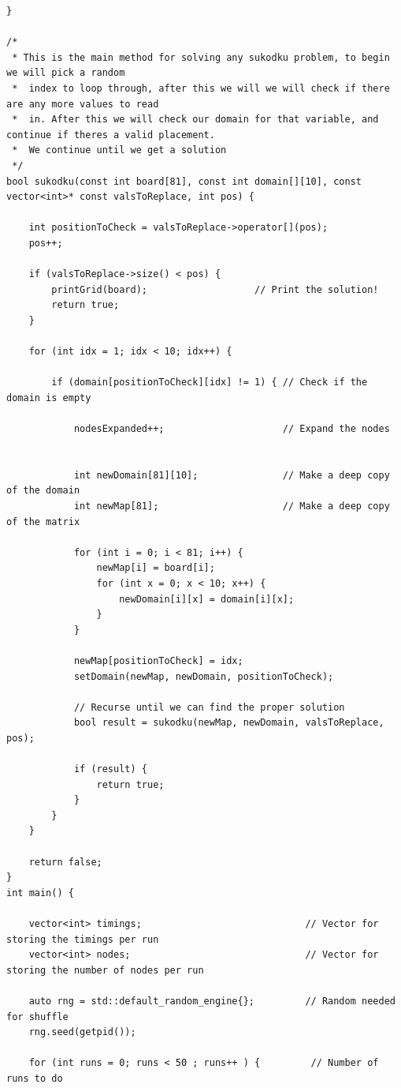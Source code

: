 \documentclass{article}
\begin{document}
\begin{titlepage}
\begin{lstlisting}
}

/*
 * This is the main method for solving any sukodku problem, to begin we will pick a random
 *  index to loop through, after this we will we will check if there are any more values to read
 *  in. After this we will check our domain for that variable, and continue if theres a valid placement.
 *  We continue until we get a solution
 */
bool sukodku(const int board[81], const int domain[][10], const vector<int>* const valsToReplace, int pos) {

    int positionToCheck = valsToReplace->operator[](pos);
    pos++;

    if (valsToReplace->size() < pos) {
        printGrid(board);                   // Print the solution!
        return true;
    }

    for (int idx = 1; idx < 10; idx++) {

        if (domain[positionToCheck][idx] != 1) { // Check if the domain is empty

            nodesExpanded++;                     // Expand the nodes


            int newDomain[81][10];               // Make a deep copy of the domain
            int newMap[81];                      // Make a deep copy of the matrix

            for (int i = 0; i < 81; i++) {
                newMap[i] = board[i];
                for (int x = 0; x < 10; x++) {
                    newDomain[i][x] = domain[i][x];
                }
            }

            newMap[positionToCheck] = idx;
            setDomain(newMap, newDomain, positionToCheck);

            // Recurse until we can find the proper solution
            bool result = sukodku(newMap, newDomain, valsToReplace, pos);

            if (result) {
                return true;
            }
        }
    }

    return false;
}
int main() {

    vector<int> timings;                             // Vector for storing the timings per run
    vector<int> nodes;                               // Vector for storing the number of nodes per run

    auto rng = std::default_random_engine{};         // Random needed for shuffle
    rng.seed(getpid());

    for (int runs = 0; runs < 50 ; runs++ ) {         // Number of runs to do


\end{lstlisting}
\end{titlepage}
\end{document}
